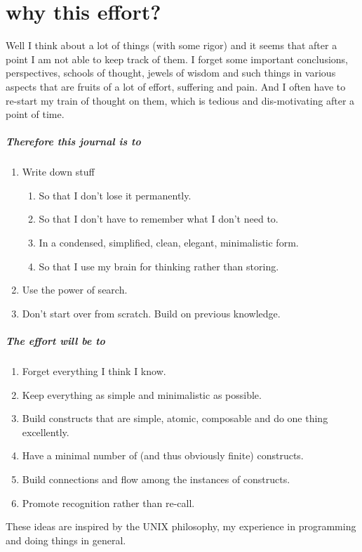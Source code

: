 \documentclass[./main.tex]{subfiles}
\begin{document}
\chapter*{why this effort?}

Well I think about a lot of things (with some rigor) and it seems that after a point I am not able to keep track of them.
I forget some important conclusions, perspectives, schools of thought, jewels of wisdom and such things in various aspects that are fruits of a lot of effort, suffering and pain.
And I often have to re-start my train of thought on them, which is tedious and dis-motivating after a point of time.

\paragraph{Therefore this journal is to}

\begin{enumerate}
  \item Write down stuff
    \begin{enumerate}
      \item So that I don't lose it permanently.
      \item So that I don't have to remember what I don't need to.
      \item In a condensed, simplified, clean, elegant, minimalistic form.
      \item So that I use my brain for thinking rather than storing.
    \end{enumerate}
  \item Use the power of search.
  \item Don't start over from scratch. Build on previous knowledge.
\end{enumerate}

\begin{figure}[h]
  \centering
\end{figure}

\paragraph{The effort will be to}
\begin{enumerate}
  \item Forget everything I think I know.
  \item Keep everything as simple and minimalistic as possible.
  \item Build constructs that are simple, atomic, composable and do one thing excellently.
  \item Have a minimal number of (and thus obviously finite) constructs.
  \item Build connections and flow among the instances of constructs.
  \item Promote recognition rather than re-call.
\end{enumerate}
These ideas are inspired by the UNIX philosophy, my experience in programming and doing things in general.
\end{document}
